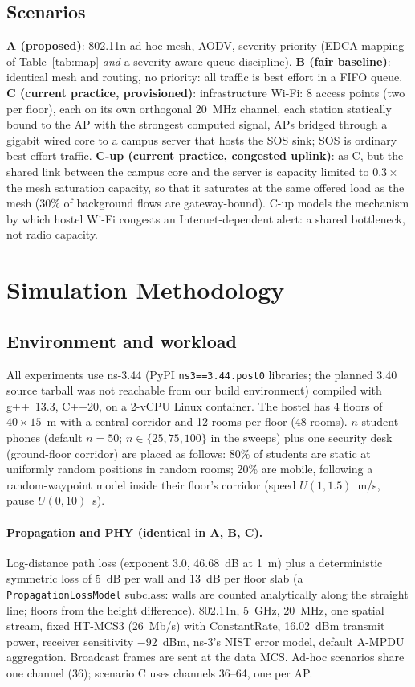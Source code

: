 \subsection{Scenarios}
\textbf{A (proposed)}: 802.11n ad-hoc mesh, AODV, severity priority (EDCA mapping of Table~\ref{tab:map} \emph{and} a severity-aware queue discipline).
\textbf{B (fair baseline)}: identical mesh and routing, no priority: all traffic is best effort in a FIFO queue.
\textbf{C (current practice, provisioned)}: infrastructure Wi-Fi: 8 access points (two per floor), each on its own orthogonal 20~MHz channel,
each station statically bound to the AP with the strongest computed signal, APs bridged through a gigabit wired core to a campus server that
hosts the SOS sink; SOS is ordinary best-effort traffic.
\textbf{C-up (current practice, congested uplink)}: as C, but the shared link between the campus core and the server is capacity limited
to $0.3\times$ the mesh saturation capacity, so that it saturates at the same offered load as the mesh (30\% of background flows are gateway-bound).
C-up models the mechanism by which hostel Wi-Fi congests an Internet-dependent alert: a shared bottleneck, not radio capacity.

\section{Simulation Methodology}\label{sec:method}
\subsection{Environment and workload}
All experiments use ns-3.44 (PyPI \texttt{ns3==3.44.post0} libraries; the planned 3.40 source tarball was not reachable from our build
environment) compiled with g++~13.3, C++20, on a 2-vCPU Linux container. The hostel has 4 floors of $40\times15$~m with a central corridor
and 12 rooms per floor (48 rooms). $n$ student phones (default $n=50$; $n\in\{25,75,100\}$ in the sweeps) plus one security desk
(ground-floor corridor) are placed as follows: 80\% of students are static at uniformly random positions in random rooms; 20\% are mobile,
following a random-waypoint model inside their floor's corridor (speed $U(1,1.5)$~m/s, pause $U(0,10)$~s).

\paragraph{Propagation and PHY (identical in A, B, C).} Log-distance path loss (exponent 3.0, 46.68~dB at 1~m) plus a deterministic symmetric
loss of 5~dB per wall and 13~dB per floor slab (a \texttt{PropagationLossModel} subclass: walls are counted analytically along the
straight line; floors from the height difference). 802.11n, 5~GHz, 20~MHz, one spatial stream, fixed HT-MCS3 (26~Mb/s) with
ConstantRate, 16.02~dBm transmit power, receiver sensitivity $-92$~dBm, ns-3's NIST error model, default A-MPDU aggregation. Broadcast frames are sent at the
data MCS. Ad-hoc scenarios share one channel (36); scenario C uses channels 36--64, one per AP.

